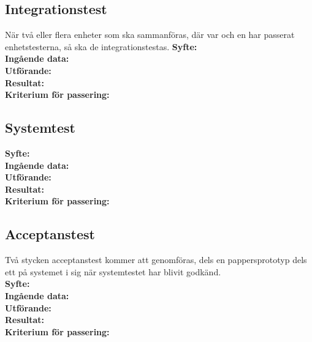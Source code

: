 \documentclass[a4paper,10pt]{article}
\begin{document}
\subsection{Integrationstest}
När två eller flera enheter som ska sammanföras, där var och en har passerat enhetstesterna, så ska de integrationstestas.
   \textbf{Syfte:}
    \\ \textbf{Ingående data:}
    \\ \textbf{Utförande:}
    \\ \textbf{Resultat:}
    \\ \textbf{Kriterium för passering:}
\subsection{Systemtest}
   \textbf{Syfte:}
    \\ \textbf{Ingående data:}
    \\ \textbf{Utförande:}
    \\ \textbf{Resultat:}
    \\ \textbf{Kriterium för passering:}
\subsection{Acceptanstest}
Två stycken acceptanstest kommer att genomföras, dels en pappersprototyp dels ett på systemet i sig när systemtestet har blivit godkänd.
    \\ \textbf{Syfte:}
    \\ \textbf{Ingående data:}
    \\ \textbf{Utförande:}
    \\ \textbf{Resultat:}
    \\ \textbf{Kriterium för passering:}
\end{document}
